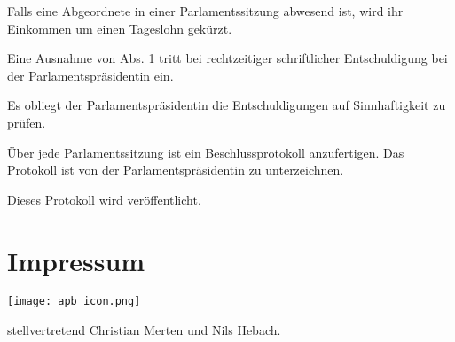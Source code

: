 \documentclass{sasbase}
\begin{document}
\begin{article}[Abwesenheit]
    \item Falls eine Abgeordnete in einer Parlamentssitzung abwesend ist, wird ihr Einkommen um
        einen Tageslohn gekürzt.
    \item Eine Ausnahme von Abs. 1 tritt bei rechtzeitiger schriftlicher Entschuldigung bei der
        Parlamentspräsidentin ein.
    \item Es obliegt der Parlamentspräsidentin die Entschuldigungen auf Sinnhaftigkeit zu prüfen.
\end{article}

\begin{article}[Protokoll]
\item Über jede Parlamentssitzung ist ein Beschlussprotokoll anzufertigen. Das Protokoll ist von der Parlamentspräsidentin zu unterzeichnen.
\item Dieses Protokoll wird ver\"{o}ffentlicht.	
\end{article}
\section{Impressum}
\begin{minipage}{0.4\linewidth}
\texttt{[image: apb\_icon.png]}
\end{minipage}
\begin{minipage}{0.5\linewidth}
{\raggedright stellvertretend Christian Merten und Nils Hebach.}
\end{minipage}
\end{document}

